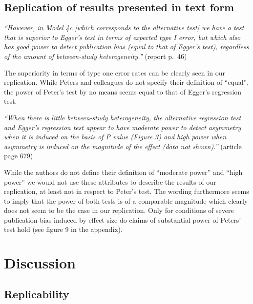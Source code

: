 \documentclass[
  english,
  doc,floatsintext,draftall]{apa6}
\begin{document}
\hypertarget{replication-of-results-presented-in-text-form}{%
\subsection{Replication of results presented in text form}\label{replication-of-results-presented-in-text-form}}

\emph{\enquote{However, in Model 4c {[}which corresponds to the alternative test{]} we have a test that is superior to Egger's test in terms of expected type I error, but which also has good power to detect publication bias (equal to that of Egger's test), regardless of the amount of between-study heterogeneity.}} (report p.~46)

The superiority in terms of type one error rates can be clearly seen in our replication.
While Peters and colleagues do not specify their definition of \enquote{equal},
the power of Peter's test by no means seems equal to that of Egger's regression test.

\emph{\enquote{When there is little between-study heterogeneity, the alternative regression test and Egger's regression test appear to have moderate power to detect asymmetry when it is induced on the basis of P value (Figure 3) and high power when asymmetry is induced on the magnitude of the effect (data not shown).}} (article page 679)

While the authors do not define their definition of \enquote{moderate power} and \enquote{high power} we would not use these attributes to describe the results of our replication,
at least not in respect to Peter's test.
The wording furthermore seems to imply that the power of both tests is of a comparable magnitude which clearly does not seem to be the case in our replication.
Only for conditions of severe publication bias induced by effect size do claims of substantial power of Peters' test hold (see figure 9 in the appendix).

\FloatBarrier

\hypertarget{discussion}{%
\section{Discussion}\label{discussion}}

\hypertarget{replicability}{%
\subsection{Replicability}\label{replicability}}
\end{document}
